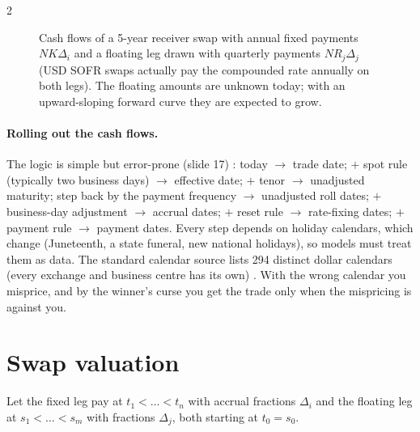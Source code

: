 \begin{paracol}{2}
\begin{figure}[ht]
\centering
{}
\caption{Cash flows of a 5-year receiver swap with annual fixed payments $NK\Delta_i$ and a floating leg drawn
with quarterly payments $NR_j\Delta_j$ (USD SOFR swaps actually pay the compounded rate annually on both legs).
The floating amounts are unknown today; with an upward-sloping forward curve they are expected to grow.}
\label{ch06:fig-swapflows}
\end{figure}

\paragraph{Rolling out the cash flows.} The logic is simple but error-prone (slide 17) :
today $\to$ trade date; $+$ spot rule (typically two business days) $\to$ effective date; $+$ tenor $\to$
unadjusted maturity; step back by the payment frequency $\to$ unadjusted roll dates; $+$ business-day adjustment
$\to$ accrual dates; $+$ reset rule $\to$ rate-fixing dates; $+$ payment rule $\to$ payment dates. Every step
depends on holiday calendars, which change (Juneteenth, a state funeral, new national holidays), so models must
treat them as data. The standard calendar source lists 294 distinct dollar calendars (every exchange and business
centre has its own) . With the wrong calendar you misprice, and by the winner's curse you get
the trade only when the mispricing is against you.

\section{Swap valuation}\label{ch06:sec-swapval}
Let the fixed leg pay at $t_1<\dots<t_n$ with accrual fractions $\Delta_i$ and the floating leg at
$s_1<\dots<s_m$ with fractions $\Delta_j$, both starting at $t_0=s_0$.


\end{paracol}
